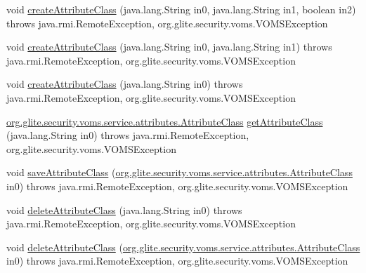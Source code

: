 \begin{DoxyCompactItemize}
\item 
void \hyperlink{interfaceorg_1_1glite_1_1security_1_1voms_1_1service_1_1attributes_1_1VOMSAttributes_ada20938c0dd05bda033b92f9acbc7327}{createAttributeClass} (java.lang.String in0, java.lang.String in1, boolean in2)  throws java.rmi.RemoteException, org.glite.security.voms.VOMSException
\item 
void \hyperlink{interfaceorg_1_1glite_1_1security_1_1voms_1_1service_1_1attributes_1_1VOMSAttributes_a12ce930632954c17add22c27010d2dd0}{createAttributeClass} (java.lang.String in0, java.lang.String in1)  throws java.rmi.RemoteException, org.glite.security.voms.VOMSException
\item 
void \hyperlink{interfaceorg_1_1glite_1_1security_1_1voms_1_1service_1_1attributes_1_1VOMSAttributes_a337139200084137cc80ddc3a34dd112c}{createAttributeClass} (java.lang.String in0)  throws java.rmi.RemoteException, org.glite.security.voms.VOMSException
\item 
\hyperlink{classorg_1_1glite_1_1security_1_1voms_1_1service_1_1attributes_1_1AttributeClass}{org.glite.security.voms.service.attributes.AttributeClass} \hyperlink{interfaceorg_1_1glite_1_1security_1_1voms_1_1service_1_1attributes_1_1VOMSAttributes_a2ca8ea4a72ec550c8eeed74858b2490e}{getAttributeClass} (java.lang.String in0)  throws java.rmi.RemoteException, org.glite.security.voms.VOMSException
\item 
void \hyperlink{interfaceorg_1_1glite_1_1security_1_1voms_1_1service_1_1attributes_1_1VOMSAttributes_a96cefd9ceb19a203542d719614e588ea}{saveAttributeClass} (\hyperlink{classorg_1_1glite_1_1security_1_1voms_1_1service_1_1attributes_1_1AttributeClass}{org.glite.security.voms.service.attributes.AttributeClass} in0)  throws java.rmi.RemoteException, org.glite.security.voms.VOMSException
\item 
void \hyperlink{interfaceorg_1_1glite_1_1security_1_1voms_1_1service_1_1attributes_1_1VOMSAttributes_af624fb5081b5a062dfb3f77464025c72}{deleteAttributeClass} (java.lang.String in0)  throws java.rmi.RemoteException, org.glite.security.voms.VOMSException
\item 
void \hyperlink{interfaceorg_1_1glite_1_1security_1_1voms_1_1service_1_1attributes_1_1VOMSAttributes_a1e39cc4132d43da6354c8f7ea8bff77b}{deleteAttributeClass} (\hyperlink{classorg_1_1glite_1_1security_1_1voms_1_1service_1_1attributes_1_1AttributeClass}{org.glite.security.voms.service.attributes.AttributeClass} in0)  throws java.rmi.RemoteException, org.glite.security.voms.VOMSException

\end{DoxyCompactItemize}
